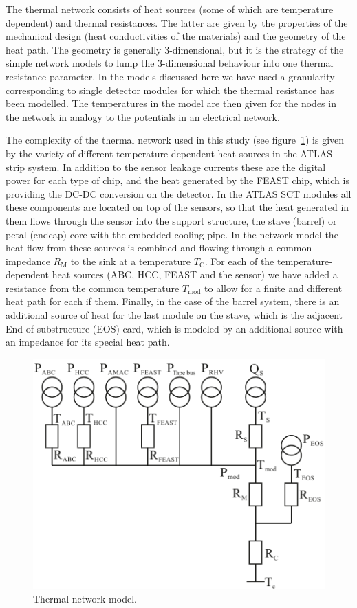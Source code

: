 The thermal network consists of heat sources (some of which are temperature dependent) and thermal resistances. The latter are given by the properties of the mechanical design (heat conductivities of the materials) and the geometry of the heat path. The geometry is generally 3-dimensional, but it is the strategy of the simple network models to lump the 3-dimensional behaviour into one thermal resistance parameter. In the models discussed here we have used a granularity corresponding to single detector modules for which the thermal resistance has been modelled. The temperatures in the model are then given for the nodes in the network in analogy to the potentials in an electrical network.

The complexity of the thermal network used in this study (see figure~\ref{fig:thermalmodel}) is given by the variety of different temperature-dependent heat sources in the ATLAS strip system. In addition to the sensor leakage currents these are the digital power for each type of chip, and the heat generated by the FEAST chip, which is providing the DC-DC conversion on the detector. In the ATLAS SCT modules all these components are located on top of the sensors, so that the heat generated in them flows through the sensor into the support structure, the stave (barrel) or petal (endcap) core with the embedded cooling pipe. In the network model the heat flow from these sources is combined and flowing through a common impedance $R_\text{M}$ to the sink at a temperature $T_\text{C}$. For each of the temperature-dependent heat sources (ABC, HCC, FEAST and the sensor) we have added a resistance from the common temperature $T_\text{mod}$ to allow for a finite and different heat path for each if them. Finally, in the case of the barrel system, there is an additional source of heat for the last module on the stave, which is the adjacent End-of-substructure (EOS) card, which is modeled by an additional source with an impedance for its special heat path. 

\begin{figure}[ht]
\centering
\includegraphics[width=0.6\linewidth]{figures/Thermalmodel.pdf}
\caption{Thermal network model.}
\label{fig:thermalmodel}
\end{figure}

